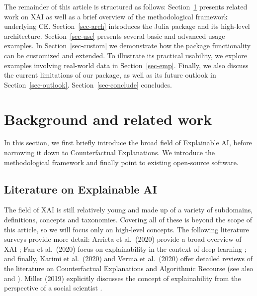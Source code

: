 \documentclass{juliacon}
\begin{document}
The remainder of this article is structured as follows:
Section~\ref{sec-related} presents related work on XAI as well as a
brief overview of the methodological framework underlying CE.
Section~\ref{sec-arch} introduces the Julia package and its high-level
architecture. Section~\ref{sec-use} presents several basic and advanced
usage examples. In Section~\ref{sec-custom} we demonstrate how the
package functionality can be customized and extended. To illustrate its
practical usability, we explore examples involving real-world data in
Section~\ref{sec-emp}. Finally, we also discuss the current limitations
of our package, as well as its future outlook in
Section~\ref{sec-outlook}. Section~\ref{sec-conclude} concludes.

\hypertarget{sec-related}{%
\section{Background and related work}\label{sec-related}}

In this section, we first briefly introduce the broad field of
Explainable AI, before narrowing it down to Counterfactual Explanations.
We introduce the methodological framework and finally point to existing
open-source software.

\hypertarget{literature-on-explainable-ai}{%
\subsection{Literature on Explainable
AI}\label{literature-on-explainable-ai}}

The field of XAI is still relatively young and made up of a variety of
subdomains, definitions, concepts and taxonomies. Covering all of these
is beyond the scope of this article, so we will focus only on high-level
concepts. The following literature surveys provide more detail: Arrieta
et al.~(2020) provide a broad overview of XAI
\autocite{arrieta2020explainable}; Fan et al.~(2020) focus on
explainability in the context of deep learning
\autocite{fan2020interpretability}; and finally, Karimi et al.~(2020)
\autocite{karimi2020survey} and Verma et al.~(2020)
\textcite{verma2020counterfactual} offer detailed reviews of the
literature on Counterfactual Explanations and Algorithmic Recourse (see
also \textcite{molnar2020interpretable} and
\textcite{varshney2022trustworthy}). Miller (2019) explicitly discusses
the concept of explainability from the perspective of a social scientist
\autocite{miller2019explanation}.
\end{document}

